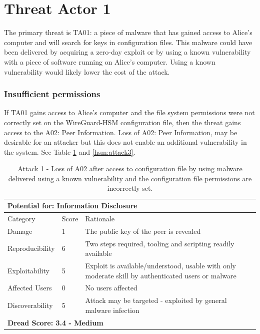 \documentclass [11pt, proquest] {uwthesis}[2020/02/24]
\begin{document}
\section{Threat Actor 1}
The primary threat is TA01: a piece of malware that has gained access to Alice's computer and will search for keys in configuration files. This malware could have been delivered by acquiring a zero-day exploit or by using a known vulnerability with a piece of software running on Alice's computer. Using a known vulnerability would likely lower the cost of the attack.

\subsubsection{Insufficient permissions}
If TA01 gains access to Alice's computer and the file system permissions were not correctly set on the WireGuard-HSM configuration file, then the threat gains access to the A02: Peer Information. Loss of A02: Peer Information, may be desirable for an attacker but this does not enable an additional vulnerability in the system.
See Table \ref{hsm:attack1} and \ref{hsm:attack3}.

\begin{table}[H]
\begin{tabular}{|m{3cm}|m{1cm}|p{27em} |}
\multicolumn{3}{l}{Potential for: Information Disclosure}    \\
\hline
Category & Score & Rationale     \\
\hline
Damage          & 1     & The public key of the peer is revealed  \\
\hline
Reproducibility & 6     & Two steps required, tooling and scripting readily available  \\
\hline
Exploitability & 5      & Exploit is available/understood, usable with only moderate skill by authenticated users or malware \\
\hline
Affected Users  & 0     & No users affected  \\
\hline
Discoverability & 5     & Attack may be targeted - exploited by general malware infection \\
\hline
\multicolumn{3}{l}{\textbf{Dread Score: 3.4 - Medium}} 
\end{tabular}
\caption{Attack 1 - Loss of A02 after access to configuration file by using malware delivered using a known vulnerability and the configuration file permissions are incorrectly set.}
\label{hsm:attack1}
\end{table}
\end{document}
